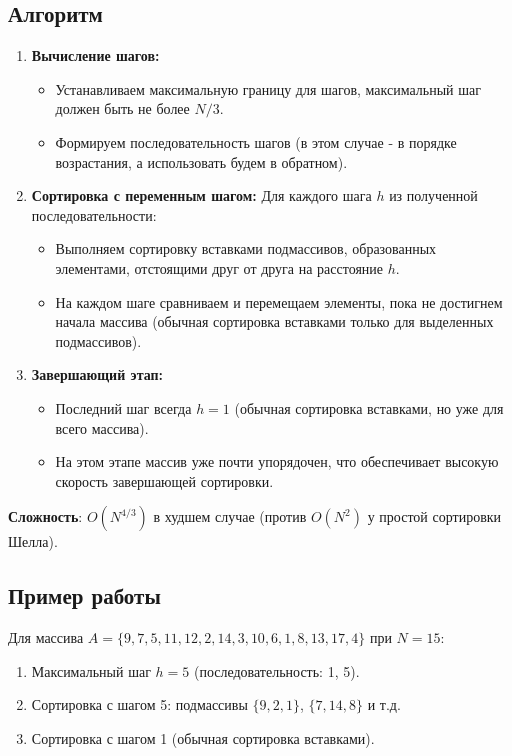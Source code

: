 \documentclass[a4paper,14pt]{extarticle}
\begin{document}
\subsection*{Алгоритм}
\begin{enumerate}
    \item \textbf{Вычисление шагов:}
    \begin{itemize}
        \item Устанавливаем максимальную границу для шагов, максимальный шаг должен быть не более $N/3$.
        \item Формируем последовательность шагов (в этом случае - в порядке возрастания, а использовать будем в обратном).
    \end{itemize}

    \item \textbf{Сортировка с переменным шагом:}
Для каждого шага $h$ из полученной последовательности:
    \begin{itemize}
        \item Выполняем сортировку вставками подмассивов, образованных элементами, отстоящими друг от друга на расстояние $h$.
        \item На каждом шаге сравниваем и перемещаем элементы, пока не достигнем начала массива (обычная сортировка вставками только для выделенных подмассивов).
    \end{itemize}

    \item \textbf{Завершающий этап:}
    \begin{itemize}
        \item Последний шаг всегда $h=1$ (обычная сортировка вставками, но уже для всего массива).
        \item На этом этапе массив уже почти упорядочен, что обеспечивает высокую скорость завершающей сортировки.
    \end{itemize}
\end{enumerate}

\textbf{Сложность}: $O(N^{4/3})$ в худшем случае (против $O(N^2)$ у простой сортировки Шелла).

\subsection*{Пример работы}
Для массива $A = \{9, 7, 5, 11, 12, 2, 14, 3, 10, 6, 1, 8, 13, 17, 4\}$ при $N=15$:
\begin{enumerate}
    \item Максимальный шаг $h=5$ (последовательность: 1, 5).
    \item Сортировка с шагом 5: подмассивы $\{9, 2, 1\}$, $\{7, 14, 8\}$ и т.д.
    \item Сортировка с шагом 1 (обычная сортировка вставками).
\end{enumerate}
\end{document}
